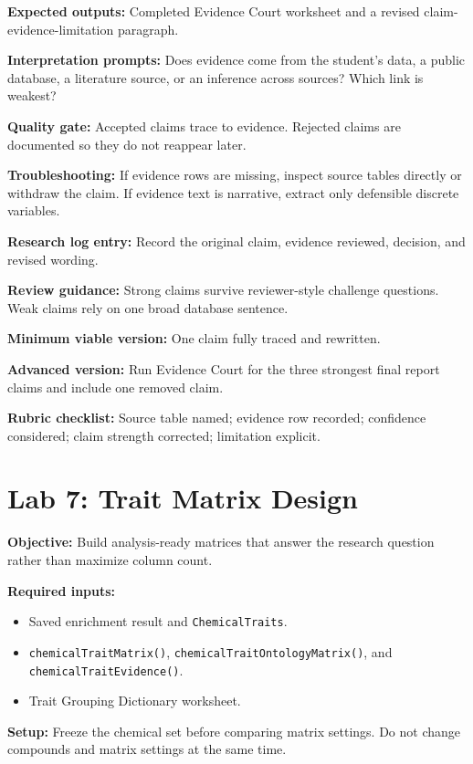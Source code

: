 \textbf{Expected outputs:} Completed Evidence Court worksheet and a revised claim-evidence-limitation paragraph.

\textbf{Interpretation prompts:} Does evidence come from the student's data, a public database, a literature source, or an inference across sources? Which link is weakest?

\textbf{Quality gate:} Accepted claims trace to evidence. Rejected claims are documented so they do not reappear later.

\textbf{Troubleshooting:} If evidence rows are missing, inspect source tables directly or withdraw the claim. If evidence text is narrative, extract only defensible discrete variables.

\textbf{Research log entry:} Record the original claim, evidence reviewed, decision, and revised wording.

\textbf{Review guidance:} Strong claims survive reviewer-style challenge questions. Weak claims rely on one broad database sentence.

\textbf{Minimum viable version:} One claim fully traced and rewritten.

\textbf{Advanced version:} Run Evidence Court for the three strongest final report claims and include one removed claim.

\textbf{Rubric checklist:} Source table named; evidence row recorded; confidence considered; claim strength corrected; limitation explicit.

\section{Lab 7: Trait Matrix Design}
\textbf{Objective:} Build analysis-ready matrices that answer the research question rather than maximize column count.

\textbf{Required inputs:}
\begin{itemize}
  \item Saved enrichment result and \texttt{ChemicalTraits}.
  \item \texttt{chemicalTraitMatrix()}, \texttt{chemicalTraitOntologyMatrix()}, and \texttt{chemicalTraitEvidence()}.
  \item Trait Grouping Dictionary worksheet.
\end{itemize}

\textbf{Setup:} Freeze the chemical set before comparing matrix settings. Do not change compounds and matrix settings at the same time.

